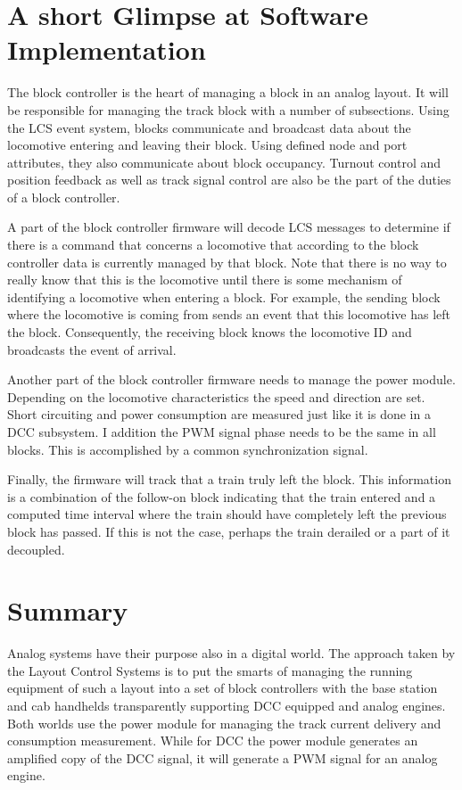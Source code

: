 \section{A short Glimpse at Software Implementation}

The block controller is the heart of managing a block in an analog layout. It will be responsible for managing the track block with a number of subsections. Using the LCS event system, blocks communicate and broadcast data about the locomotive entering and leaving their block. Using defined node and port attributes, they also communicate about block occupancy. Turnout control and position feedback as well as track signal control are also be the part of the duties of a block controller.

A part of the block controller firmware will decode LCS messages to determine if there is a command that concerns a locomotive that according to the block controller data is currently managed by that block. Note that there is no way to really know that this is the locomotive until there is some mechanism of identifying a locomotive when entering a block. For example, the sending block where the locomotive is coming from sends an event that this locomotive has left the block. Consequently, the receiving block knows the locomotive ID and broadcasts the event of arrival.

Another part of the block controller firmware needs to manage the power module. Depending on the locomotive characteristics the speed and direction are set. Short circuiting and power consumption are measured just like it is done in a DCC subsystem. I addition the PWM signal phase needs to be the same in all blocks. This is accomplished by a common synchronization signal.

Finally, the firmware will track that a train truly left the block. This information is a combination of the follow-on block indicating that the train entered and a computed time interval where the train should have completely left the previous block has passed. If this is not the case, perhaps the train derailed or a part of it decoupled.

\section{Summary}

Analog systems have their purpose also in a digital world. The approach taken by the Layout Control Systems is to put the smarts of managing the running equipment of such a layout into a set of block controllers with the base station and cab handhelds transparently supporting DCC equipped and analog engines. Both worlds use the power module for managing the track current delivery and consumption measurement. While for DCC the power module generates an amplified copy of the DCC signal, it will generate a PWM signal for an analog engine.

